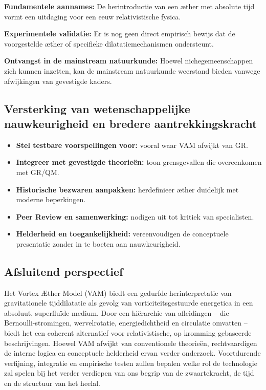 \textbf{Fundamentele aannames:} De herintroductie van een æther met absolute tijd vormt een uitdaging voor een eeuw relativistische fysica.

\textbf{Experimentele validatie:} Er is nog geen direct empirisch bewijs dat de voorgestelde æther of specifieke dilatatiemechanismen ondersteunt.

\textbf{Ontvangst in de mainstream natuurkunde:} Hoewel nichegemeenschappen zich kunnen inzetten, kan de mainstream natuurkunde weerstand bieden vanwege afwijkingen van gevestigde kaders.

\subsection{Versterking van wetenschappelijke nauwkeurigheid en bredere aantrekkingskracht}

\begin{itemize}
\item \textbf{Stel testbare voorspellingen voor:} vooral waar VAM afwijkt van GR.
\item \textbf{Integreer met gevestigde theorieën:} toon grensgevallen die overeenkomen met GR/QM. \item \textbf{Historische bezwaren aanpakken:} herdefinieer æther duidelijk met moderne beperkingen.
\item \textbf{Peer Review en samenwerking:} nodigen uit tot kritiek van specialisten.
\item \textbf{Helderheid en toegankelijkheid:} vereenvoudigen de conceptuele presentatie zonder in te boeten aan nauwkeurigheid.
\end{itemize}

\subsection{Afsluitend perspectief}

Het Vortex Æther Model (VAM) biedt een gedurfde herinterpretatie van gravitationele tijddilatatie als gevolg van vorticiteitsgestuurde energetica in een absoluut, superfluïde medium. Door een hiërarchie van afleidingen – die Bernoulli-stromingen, wervelrotatie, energiedichtheid en circulatie omvatten – biedt het een coherent alternatief voor relativistische, op kromming gebaseerde beschrijvingen. Hoewel VAM afwijkt van conventionele theorieën, rechtvaardigen de interne logica en conceptuele helderheid ervan verder onderzoek. Voortdurende verfijning, integratie en empirische testen zullen bepalen welke rol de technologie zal spelen bij het verder verdiepen van ons begrip van de zwaartekracht, de tijd en de structuur van het heelal.